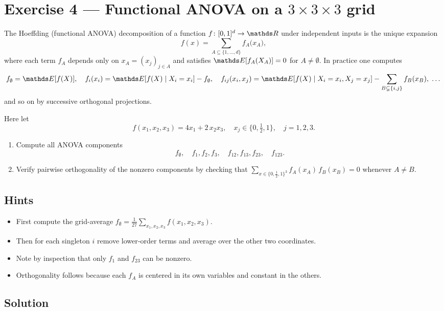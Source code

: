 \documentclass[a4paper]{article}
\begin{document}
\section*{Exercise 4 — Functional ANOVA on a $3\times3\times3$ grid}
\label{ex:FA_grid_improved}

The Hoeffding (functional ANOVA) decomposition of a function 
$f\colon[0,1]^d\to\R$ under independent inputs is the unique expansion
\[
f(x)
=\sum_{A\subseteq\{1,\dots,d\}} f_A\bigl(x_A\bigr),
\]
where each term $f_A$ depends only on $x_A=(x_j)_{j\in A}$ and satisfies
$\E[f_A(X_A)]=0$ for $A\neq\emptyset$.  In practice one computes
\[
f_\emptyset=\E[f(X)],\quad
f_i(x_i)=\E[f(X)\mid X_i=x_i]-f_\emptyset,\quad
f_{ij}(x_i,x_j)=\E[f(X)\mid X_i=x_i,X_j=x_j]
-\sum_{B\subsetneq\{i,j\}}f_B(x_B),\;\dots
\]
and so on by successive orthogonal projections.

Here let
\[
f(x_1,x_2,x_3)=4x_1 + 2\,x_2x_3,
\quad
x_j\in\{0,\tfrac12,1\},\quad j=1,2,3.
\]
\begin{enumerate}%
  \item Compute all ANOVA components
        \[
          f_\emptyset,\quad
          f_{1},f_{2},f_{3},\quad
          f_{12},f_{13},f_{23},\quad
          f_{123}.
        \]
  \item Verify pairwise orthogonality of the nonzero components
        by checking that
        \(\sum_{x\in\{0,\frac12,1\}^3} f_A(x_A)\,f_B(x_B)=0\)
        whenever $A\neq B$.
\end{enumerate}

\subsection*{Hints}
\begin{itemize}
  \item First compute the grid-average
        \(f_\emptyset=\tfrac1{27}\sum_{x_1,x_2,x_3}f(x_1,x_2,x_3).\)
  \item Then for each singleton $i$ remove lower‐order terms and average
        over the other two coordinates.
  \item Note by inspection that only $f_1$ and $f_{23}$ can be nonzero.
  \item Orthogonality follows because each $f_A$ is centered in its own
        variables and constant in the others.
\end{itemize}

\subsection*{Solution}
\end{document}
